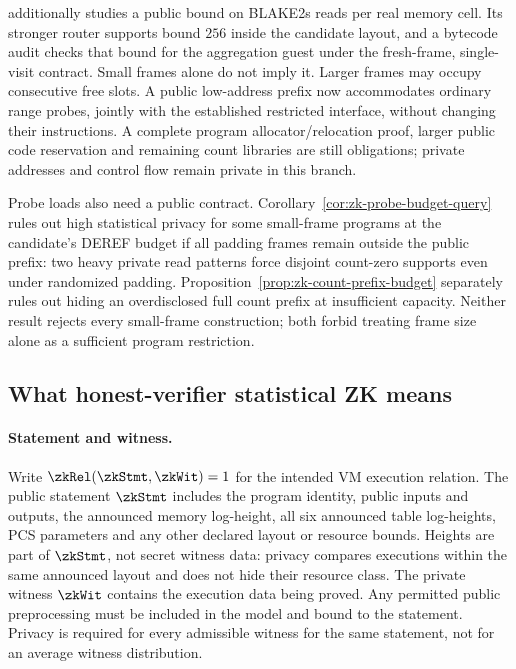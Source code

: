  additionally studies a public bound on BLAKE2s reads per real memory cell. Its stronger router supports bound $256$ inside the candidate layout, and a bytecode audit checks that bound for the aggregation guest under the fresh-frame, single-visit contract. Small frames alone do not imply it. Larger frames may occupy consecutive free slots. A public low-address prefix now accommodates ordinary range probes, jointly with the established restricted interface, without changing their instructions. A complete program allocator/relocation proof, larger public code reservation and remaining count libraries are still obligations; private addresses and control flow remain private in this branch.

Probe loads also need a public contract. Corollary~\ref{cor:zk-probe-budget-query} rules out high statistical privacy for some small-frame programs at the candidate's DEREF budget if all padding frames remain outside the public prefix: two heavy private read patterns force disjoint count-zero supports even under randomized padding. Proposition~\ref{prop:zk-count-prefix-budget} separately rules out hiding an overdisclosed full count prefix at insufficient capacity. Neither result rejects every small-frame construction; both forbid treating frame size alone as a sufficient program restriction.

\subsection{What honest-verifier statistical ZK means}\label{sec:zk-definition}

\paragraph{Statement and witness.} Write $\zkRel(\zkStmt,\zkWit)=1$ for the intended VM execution relation. The public statement $\zkStmt$ includes the program identity, public inputs and outputs, the announced memory log-height, all six announced table log-heights, PCS parameters and any other declared layout or resource bounds. Heights are part of $\zkStmt$, not secret witness data: privacy compares executions within the same announced layout and does not hide their resource class. The private witness $\zkWit$ contains the execution data being proved. Any permitted public preprocessing must be included in the model and bound to the statement. Privacy is required for every admissible witness for the same statement, not for an average witness distribution.

